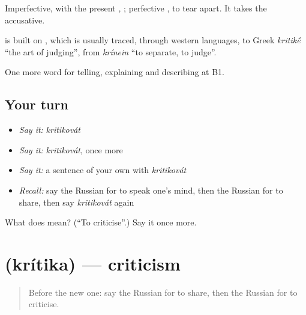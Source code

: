 Imperfective, with the present \emph{, }; perfective \emph{}, to tear apart. It takes the accusative.

\begin{cousinweb}
\textbf{} is built on \emph{}, which is usually traced, through western languages, to Greek \emph{kritik\'{\={e}}} \textquotedblleft{}the art of judging\textquotedblright{}, from \emph{krínein} \textquotedblleft{}to separate, to judge\textquotedblright{}.
\end{cousinweb}

\begin{grammarlens}[title={What you've built}]
One more word for telling, explaining and describing at B1.
\end{grammarlens}

\subsection*{Your turn}
\begin{itemize}
\raggedright
  \item \emph{Say it:} \emph{kritikovát}
  \item \emph{Say it:} \emph{kritikovát}, once more
  \item \emph{Say it:} a sentence of your own with \emph{kritikovát}
  \item \emph{Recall:} say the Russian for to speak one’s mind, then the Russian for to share, then say \emph{kritikovát} again
\end{itemize}

\begin{tcolorbox}[breakable,colback=teal!4,colframe=teal!35!black,title={Before you move on}]
What does  mean? (\textquotedblleft{}To criticise\textquotedblright{}.) Say it once more.
\end{tcolorbox}
\section[\texorpdfstring{\ru{критика} (krítika)}{критика (krítika)}]{ (krítika) — criticism}

\label{lesson:RU-C343-kritika}



\begin{quote}
Before the new one: say the Russian for to share, then the Russian for to criticise.
\end{quote}

